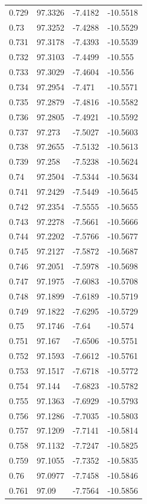 \begin{tabular}{llll}
0.729 & 97.3326 & -7.4182 & -10.5518 \\
0.73 & 97.3252 & -7.4288 & -10.5529 \\
0.731 & 97.3178 & -7.4393 & -10.5539 \\
0.732 & 97.3103 & -7.4499 & -10.555 \\
0.733 & 97.3029 & -7.4604 & -10.556 \\
0.734 & 97.2954 & -7.471 & -10.5571 \\
0.735 & 97.2879 & -7.4816 & -10.5582 \\
0.736 & 97.2805 & -7.4921 & -10.5592 \\
0.737 & 97.273 & -7.5027 & -10.5603 \\
0.738 & 97.2655 & -7.5132 & -10.5613 \\
0.739 & 97.258 & -7.5238 & -10.5624 \\
0.74 & 97.2504 & -7.5344 & -10.5634 \\
0.741 & 97.2429 & -7.5449 & -10.5645 \\
0.742 & 97.2354 & -7.5555 & -10.5655 \\
0.743 & 97.2278 & -7.5661 & -10.5666 \\
0.744 & 97.2202 & -7.5766 & -10.5677 \\
0.745 & 97.2127 & -7.5872 & -10.5687 \\
0.746 & 97.2051 & -7.5978 & -10.5698 \\
0.747 & 97.1975 & -7.6083 & -10.5708 \\
0.748 & 97.1899 & -7.6189 & -10.5719 \\
0.749 & 97.1822 & -7.6295 & -10.5729 \\
0.75 & 97.1746 & -7.64 & -10.574 \\
0.751 & 97.167 & -7.6506 & -10.5751 \\
0.752 & 97.1593 & -7.6612 & -10.5761 \\
0.753 & 97.1517 & -7.6718 & -10.5772 \\
0.754 & 97.144 & -7.6823 & -10.5782 \\
0.755 & 97.1363 & -7.6929 & -10.5793 \\
0.756 & 97.1286 & -7.7035 & -10.5803 \\
0.757 & 97.1209 & -7.7141 & -10.5814 \\
0.758 & 97.1132 & -7.7247 & -10.5825 \\
0.759 & 97.1055 & -7.7352 & -10.5835 \\
0.76 & 97.0977 & -7.7458 & -10.5846 \\
0.761 & 97.09 & -7.7564 & -10.5856 \\

\end{tabular}
